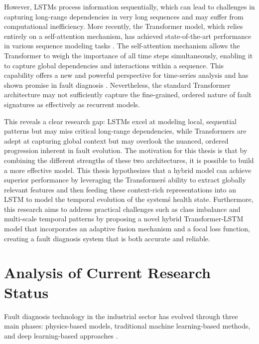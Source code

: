 However, LSTMs process information sequentially, which can lead to challenges in capturing long-range dependencies in very long sequences and may suffer from computational inefficiency. More recently, the Transformer model, which relies entirely on a self-attention mechanism, has achieved state-of-the-art performance in various sequence modeling tasks \cite{vaswani2017attention}. The self-attention mechanism allows the Transformer to weigh the importance of all time steps simultaneously, enabling it to capture global dependencies and interactions within a sequence. This capability offers a new and powerful perspective for time-series analysis and has shown promise in fault diagnosis \cite{wen2021time}. Nevertheless, the standard Transformer architecture may not sufficiently capture the fine-grained, ordered nature of fault signatures as effectively as recurrent models.

This reveals a clear research gap: LSTMs excel at modeling local, sequential patterns but may miss critical long-range dependencies, while Transformers are adept at capturing global context but may overlook the nuanced, ordered progression inherent in fault evolution. The motivation for this thesis is that by combining the different strengths of these two architectures, it is possible to build a more effective model. This thesis hypothesizes that a hybrid model can achieve superior performance by leveraging the Transformer\'s ability to extract globally relevant features and then feeding these context-rich representations into an LSTM to model the temporal evolution of the system\'s health state. Furthermore, this research aims to address practical challenges such as class imbalance and multi-scale temporal patterns by proposing a novel hybrid Transformer-LSTM model that incorporates an adaptive fusion mechanism and a focal loss function, creating a fault diagnosis system that is both accurate and reliable.


\section{Analysis of Current Research Status}
\label{sec:introduction:current_status}

Fault diagnosis technology in the industrial sector has evolved through three main phases: physics-based models, traditional machine learning-based methods, and deep learning-based approaches \cite{lei2016intelligent, zhao2019deep}.

